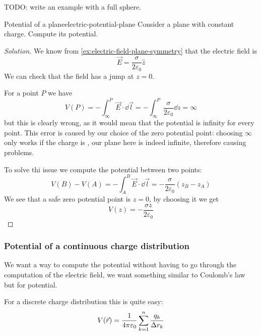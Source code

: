 \documentclass[12pt]{extarticle}
\begin{document}
TODO: write an example with a full sphere.

\begin{example}{Potential of a plane}{electric-potential-plane}
    Consider a plane with constant charge. Compute its potential.
\end{example}

\begin{proof}[Solution]
    We know from \cref{ex:electric-field-plane-symmetry} that the electric field is
    \begin{equation}
        \vec E = \frac{\sigma}{2 \varepsilon_0} \hat z
    \end{equation}
    We can check that the field has a jump at $z = 0$.

    For a point $P$ we have
    \begin{equation}
        V(P) = - \int_\infty^P \vec E \cdot \dd{\vec l} = - \int^P_\infty \frac{\sigma}{2 \varepsilon_0} \dd{z} = \infty
    \end{equation}
    but this is clearly wrong, as it would mean that the potential is infinity for every point.
    This error is caused by our choice of the zero potential point: choosing $\infty$ only works if the charge is , our plane here is indeed infinite, therefore causing problems.

    To solve thi issue we compute the potential between two points:
    \begin{equation}
        V(B) - V(A) = -\int_A^B \vec E \cdot \dd{\vec l} = -\frac{\sigma}{2 \varepsilon_0}(z_B - z_A)
    \end{equation}
    We see that a safe zero potential point is $z = 0$, by choosing it we get
    \begin{equation}
        V(z) = -\frac{\sigma z}{2 \varepsilon_0}
    \end{equation}
\end{proof}

\subsubsection{Potential of a continuous charge distribution}

We want a way to compute the potential without having to go through the computation of the electric field, we want something similar to Coulomb's law but for potential.

For a discrete charge distribution this is quite easy:
\begin{equation}
    V(\vec r) = \frac{1}{4 \pi \varepsilon_0} \sum_{k = 1}^n \frac{q_k}{\Delta r_k}
\end{equation}
\end{document}
